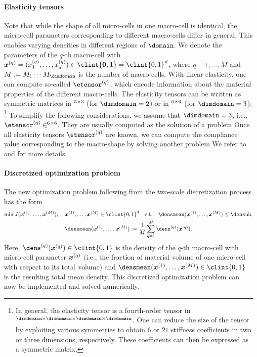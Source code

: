 \paragraph{Elasticity tensors}

Note that while the shape of all micro-cells in one macro-cell is identical,
the micro-cell parameters corresponding to different macro-cells differ
in general.
This enables varying densities in different regions of $\domain$.
We denote the parameters of the $q$-th macro-cell
with $\*x^{(q)} = (x_1^{(q)}, \dotsc, x_d^{(q)}) \in
\clint{\*0, \*1} = \clint{0, 1}^d$,
where $q = 1, \dotsc, M$ and
$M := M_1 \dotsm M_{\dimdomain}$ is the number of macro-cells.
With linear elasticity,
one can compute so-called  $\etensor^{(q)}$,
which encode information about the material properties
of the different macro-cells.
The elasticity tensors can be written as symmetric matrices
in $\real^{3 \times 3}$ (for $\dimdomain = 2$) or
in $\real^{6 \times 6}$ (for $\dimdomain = 3$).%
\footnote{%
  In general, the elasticity tensor is a fourth-order tensor in
  $\real^{\dimdomain \times \dimdomain \times \dimdomain \times \dimdomain}$.
  One can reduce the size of the tensor by exploiting various symmetries
  \cite{Huebner14Mehrdimensionale}
  to obtain $6$ or $21$ stiffness coefficients
  in two or three dimensions, respectively.
  These coefficients can then be expressed as a symmetric matrix.%
}
To simplify the following considerations,
we assume that $\dimdomain = 3$, i.e.,
$\etensor^{(q)} \in \real^{6 \times 6}$.
They are usually computed as the solution of a \fem problem
Once all elasticity tensors $\etensor^{(q)}$ are known,
we can compute the compliance value corresponding to the macro-shape
by solving another \fem problem 
We refer to \cite{Allaire04Topology} and \cite{Huebner14Mehrdimensionale}
for more details.

\paragraph{Discretized optimization problem}

The new optimization problem following from the
two-scale discretization process has the form
\begin{subequations}
  \label{eq:topoOptProblemDiscrete}
  \begin{gather}
    \min J(\*x^{(1)}, \dotsc, \*x^{(M)}),\quad
    \*x^{(1)}, \dotsc, \*x^{(M)} \in \clint{0, 1}^d
    \quad\text{s.t.}\quad
    \densmean(\*x^{(1)}, \dotsc, \*x^{(M)}) \le \densub,\\
    \densmean(\*x^{(1)}, \dotsc, \*x^{(M)})
    := \frac{1}{M} \sum_{q=1}^M \dens^{(q)}(\*x^{(q)}).
  \end{gather}
\end{subequations}
Here, $\dens^{(q)}(\*x^{(q)}) \in \clint{0, 1}$ is the
density of the $q$-th macro-cell with micro-cell parameter ${\boldsymbol{x}}^{(q)}$
(i.e., the fraction of material volume of one micro-cell
with respect to its total volume)
and $\densmean(\*x^{(1)}, \dotsc, \*x^{(M)}) \in \clint{0, 1}$
is the resulting total mean density.
This discretized optimization problem can now be implemented and
solved numerically.
